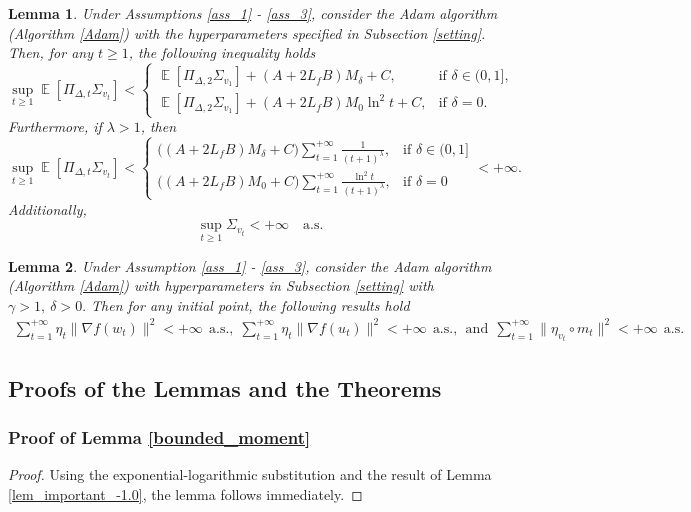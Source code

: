 \documentclass{article} %
\newtheorem{lemma}{Lemma}[section]
\DeclareMathOperator{\Expect}{\mathbb{E}}
\begin{document}
\begin{lemma}\label{lem_v_t}
Under Assumptions \ref{ass_1} - \ref{ass_3}, consider the Adam algorithm (Algorithm \ref{Adam}) with the hyperparameters specified in Subsection \ref{setting}. Then, for any $t \geq 1$, the following inequality holds
\[
\sup_{t \geq 1} \Expect[\Pi_{\Delta,t} \Sigma_{v_{t}}] <\begin{cases} 
\Expect[\Pi_{\Delta,2}\Sigma_{v_{1}}]+(A+2L_{f}B)M_{\delta}+C, & \text{if } \delta \in (0,1], \\
\Expect[\Pi_{\Delta,2}\Sigma_{v_{1}}]+(A+2L_{f}B)M_{0}\ln^{2}t+C, & \text{if } \delta = 0.
\end{cases}
\]
Furthermore, if $\lambda > 1$, then 
\[\sup_{t \geq 1} \Expect[\Pi_{\Delta,t}\Sigma_{v_{t}}] < \begin{cases} 
\big((A+2L_{f}B)M_{\delta}+C\big)\sum_{t=1}^{+\infty}\frac{1}{(t+1)^{\lambda}}, & \text{if } \delta \in (0,1] \\
\big((A+2L_{f}B)M_{0}+C\big)\sum_{t=1}^{+\infty}\frac{\ln^{2}t}{(t+1)^{\lambda}}, & \text{if } \delta = 0
\end{cases}<+\infty.\] Additionally,
\[\sup_{t \geq 1}\Sigma_{v_{t}} < +\infty \quad \text{a.s.}\]
\end{lemma}

\begin{lemma}\label{lem_sum_1}
Under Assumption \ref{ass_1} - \ref{ass_3}, consider the Adam algorithm (Algorithm \ref{Adam}) with hyperparameters in Subsection \ref{setting} with $\gamma>1,\  \delta>0.$ Then for any initial point, the following results hold
\begin{align*}
    \sum_{t=1}^{+\infty}\eta_{t}\|\nabla f(w_{t})\|^{2}<+\infty\ \ \text{a.s.,}\ \ \sum_{t=1}^{+\infty}\eta_{t}\|\nabla f(u_{t})\|^{2}<+\infty\ \ \text{a.s.},\ \ \text{and}\ \ 
\sum_{t=1}^{+\infty}\|\eta_{v_{t}}\circ m_{t}\|^{2} <+\infty\ \ \text{a.s.} 
\end{align*}
\end{lemma}

\subsection{Proofs of the Lemmas and the Theorems}
\subsubsection{Proof of Lemma \ref{bounded_moment}}
\begin{proof}
Using the exponential-logarithmic substitution and the result of Lemma \ref{lem_important_-1.0}, the lemma follows immediately.
\end{proof}
\end{document}
